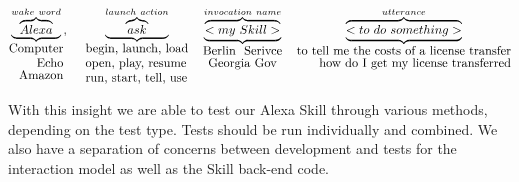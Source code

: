 \[
	\underbrace{\overbrace{Alexa}^{wake \  word}}_{\shortstack[r]{Computer\\Echo\\Amazon}} %
	, \ \ \ \ 
	\underbrace{\overbrace{ask}^{launch \ action}}_{\shortstack[l]{begin, launch, load\\open, play, resume\\run, start, tell, use}}
	\ \ \ 
	\underbrace{\overbrace{<my \ Skill>}^{invocation \ name}}_{\shortstack{Berlin \ Serivce \\ Georgia Gov}}
	\ \ \
	\underbrace{\overbrace{<to \ do \ something>}^{utterance}}_{\shortstack[r]{to tell me the costs of a license transfer\\how do I get my license transferred}}
\]






With this insight we are able to test our Alexa Skill through various methods, depending on the test type. Tests should be run individually and combined. We also have a separation of concerns between development and tests for the interaction model as well as the Skill back-end code.



